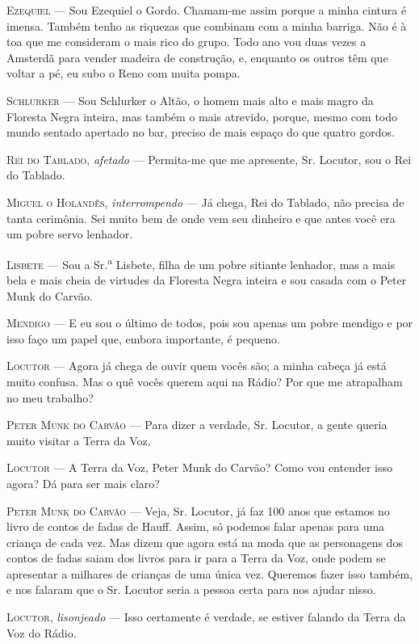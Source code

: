 \textsc{Ezequiel} --- Sou Ezequiel o Gordo. Chamam-me assim porque a minha cintura
é imensa. Também tenho as riquezas que combinam com a minha barriga. Não
é à toa que me consideram o mais rico do grupo. Todo ano vou duas vezes
a Amsterdã para vender madeira de construção, e, enquanto os outros têm
que voltar a pé, eu subo o Reno com muita pompa.

\textsc{Schlurker} --- Sou Schlurker o Altão, o homem mais alto e mais magro da
Floresta Negra inteira, mas também o mais atrevido, porque, mesmo com
todo mundo sentado apertado no bar, preciso de mais espaço do que quatro
gordos.

\textsc{Rei do Tablado}, \emph{afetado} --- Permita-me que me apresente, Sr.
Locutor, sou o Rei do Tablado.

\textsc{Miguel o Holandês}, \emph{interrompendo} --- Já chega, Rei do Tablado, não
precisa de tanta cerimônia. Sei muito bem de onde vem seu dinheiro e que
antes você era um pobre servo lenhador.

\textsc{Lisbete} --- Sou a Sr.\textsuperscript{a} Lisbete, filha de um pobre
sitiante lenhador, mas a mais bela e mais cheia de virtudes da Floresta
Negra inteira e sou casada com o Peter Munk do Carvão.

\textsc{Mendigo} --- E eu sou o último de todos, pois sou apenas um pobre mendigo
e por isso faço um papel que, embora importante, é pequeno.

\textsc{Locutor} --- Agora já chega de ouvir quem vocês são; a minha cabeça já
está muito confusa. Mas o quê vocês querem aqui na Rádio? Por que me
atrapalham no meu trabalho?

\textsc{Peter Munk do Carvão} --- Para dizer a verdade, Sr. Locutor, a gente
queria muito visitar a Terra da Voz.

\textsc{Locutor} --- A Terra da Voz, Peter Munk do Carvão? Como vou entender isso
agora? Dá para ser mais claro?

\textsc{Peter Munk do Carvão} --- Veja, Sr. Locutor, já faz 100 anos que estamos
no livro de contos de fadas de Hauff. Assim, só podemos falar apenas
para uma criança de cada vez. Mas dizem que agora está na moda que as
personagens dos contos de fadas saiam dos livros para ir para a Terra da
Voz, onde podem se apresentar a milhares de crianças de uma única vez.
Queremos fazer isso também, e nos falaram que o Sr. Locutor seria a
pessoa certa para nos ajudar nisso.

\textsc{Locutor}, \emph{lisonjeado} --- Isso certamente é verdade, se estiver
falando da Terra da Voz do Rádio.

